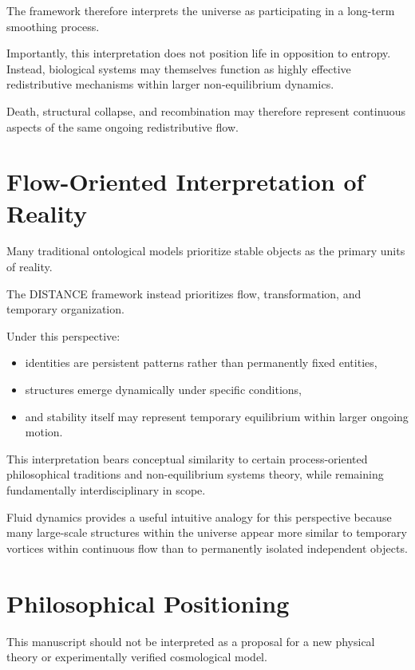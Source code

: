 \documentclass[11pt]{article}
\begin{document}
The framework therefore interprets the universe as participating in a long-term smoothing process.

Importantly, this interpretation does not position life in opposition to entropy. Instead, biological systems may themselves function as highly effective redistributive mechanisms within larger non-equilibrium dynamics.

Death, structural collapse, and recombination may therefore represent continuous aspects of the same ongoing redistributive flow.

\section{Flow-Oriented Interpretation of Reality}

Many traditional ontological models prioritize stable objects as the primary units of reality.

The DISTANCE framework instead prioritizes flow, transformation, and temporary organization.

Under this perspective:

\begin{itemize}
    \item identities are persistent patterns rather than permanently fixed entities,
    \item structures emerge dynamically under specific conditions,
    \item and stability itself may represent temporary equilibrium within larger ongoing motion.
\end{itemize}

This interpretation bears conceptual similarity to certain process-oriented philosophical traditions and non-equilibrium systems theory, while remaining fundamentally interdisciplinary in scope.

Fluid dynamics provides a useful intuitive analogy for this perspective because many large-scale structures within the universe appear more similar to temporary vortices within continuous flow than to permanently isolated independent objects.

\section{Philosophical Positioning}

This manuscript should not be interpreted as a proposal for a new physical theory or experimentally verified cosmological model.
\end{document}
